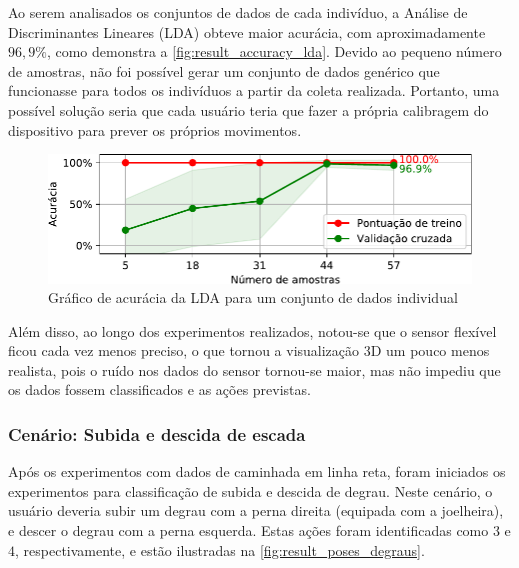 Ao serem analisados os conjuntos de dados de cada indivíduo, a Análise de Discriminantes Lineares (LDA) obteve maior acurácia, com aproximadamente \(96{,}9\%\), como demonstra a \autoref{fig:result_accuracy_lda}. Devido ao pequeno número de amostras, não foi possível gerar um conjunto de dados genérico que funcionasse para todos os indivíduos a partir da coleta realizada. Portanto, uma possível solução seria que cada usuário teria que fazer a própria calibragem do dispositivo para prever os próprios movimentos.

\begin{figure}[ht]
	\caption{\label{fig:result_accuracy_lda}Gráfico de acurácia da LDA para um conjunto de dados individual}
	\begin{center}
	    \includegraphics[width=\textwidth]{resources/result_accuracy_lda}
	\end{center}
\end{figure}

Além disso, ao longo dos experimentos realizados, notou-se que o sensor flexível ficou cada vez menos preciso, o que tornou a visualização $3$D um pouco menos realista, pois o ruído nos dados do sensor tornou-se maior, mas não impediu que os dados fossem classificados e as ações previstas.

\subsubsection{Cenário: Subida e descida de escada}

Após os experimentos com dados de caminhada em linha reta, foram iniciados os experimentos para classificação de subida e descida de degrau. Neste cenário, o usuário deveria subir um degrau com a perna direita (equipada com a joelheira), e descer o degrau com a perna esquerda. Estas ações foram identificadas como \(3\) e \(4\), respectivamente, e estão ilustradas na \autoref{fig:result_poses_degraus}.

